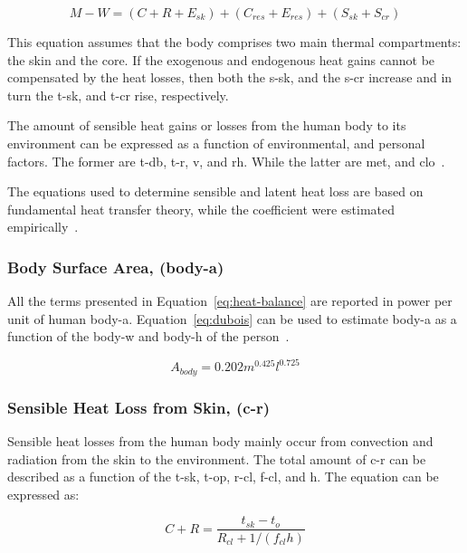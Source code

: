 \begin{equation}
    M - W = (C + R + E_{sk}) + (C_{res} + E_{res}) + (S_{sk} + S_{cr})\label{eq:heat-balance}
\end{equation}

This equation assumes that the body comprises two main thermal compartments: the skin and the core.
If the exogenous and endogenous heat gains cannot be compensated by the heat losses, then both the \ac{s-sk}, and the \ac{s-cr} increase and in turn the \ac{t-sk}, and \ac{t-cr} rise, respectively.

The amount of sensible heat gains or losses from the human body to its environment can be expressed as a function of environmental, and personal factors.
The former are \ac{t-db}, \ac{t-r}, \ac{v}, and \ac{rh}.
While the latter are \ac{met}, and \ac{clo}~\cite{ASHRA2017}.

The equations used to determine sensible and latent heat loss are based on fundamental heat transfer theory, while the coefficient were estimated empirically~\cite{ASHRA2017}.

\subsubsection{Body Surface Area, (\acs{body-a})}

All the terms presented in Equation~\ref{eq:heat-balance} are reported in power per unit of human \ac{body-a}.
Equation~\ref{eq:dubois} can be used to estimate \ac{body-a} as a function of the \ac{body-w} and \ac{body-h} of the person~\cite{DuBois}.

\begin{equation}
    A_{body} = 0.202 m^{0.425} l^{0.725}\label{eq:dubois}
\end{equation}


\subsubsection{Sensible Heat Loss from Skin, (\acs{c-r})}

Sensible heat losses from the human body mainly occur from convection and radiation from the skin to the environment.
The total amount of \ac{c-r} can be described as a function of the \ac{t-sk}, \ac{t-op}, \ac{r-cl}, \ac{f-cl}, and \ac{h}.
The equation can be expressed as:

\begin{equation}
    C+R=\frac{t_{s k}-t_{o}}{R_{c l}+1 /\left(f_{c l} h\right)}\label{eq:c-r}
\end{equation}

